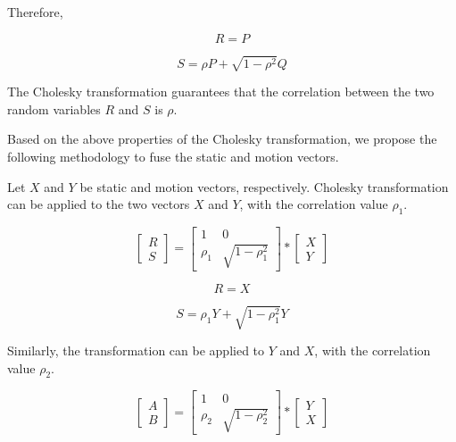 Therefore,

\begin{equation}
R = P
\end{equation}

\begin{equation}
S = \rho P + \sqrt{1-\rho^2}Q
\end{equation}

The Cholesky transformation guarantees that the correlation between the two random variables
$R$ and $S$ is $\rho$.

Based on the above properties of the Cholesky transformation, we propose the following methodology to fuse the static and
motion vectors.

Let $X$ and $Y$ be static and motion vectors, respectively. Cholesky transformation can be applied to the two vectors $X$ and $Y$, 
with the correlation value $\rho_{1}$.

\[
\begin{bmatrix}
    R     \\
    S     
\end{bmatrix}
=
\begin{bmatrix}
    1  & 0 \\
    \rho_{1}  & \sqrt{1-\rho_{1}^2}    
\end{bmatrix}
*
\begin{bmatrix}
    X    \\
    Y     
\end{bmatrix}
\]

\begin{equation}
R = X
\end{equation}

\begin{equation}
S = \rho_{1} Y + \sqrt{1-\rho_{1}^2}Y
\end{equation}

Similarly, the transformation can be applied to $Y$ and $X$, with the correlation value $\rho_{2}$.


\[
\begin{bmatrix}
    A     \\
    B     
\end{bmatrix}
=
\begin{bmatrix}
    1  & 0 \\
    \rho_{2}  & \sqrt{1-\rho_{2}^2}    
\end{bmatrix}
*
\begin{bmatrix}
    Y    \\
    X     
\end{bmatrix}
\]

